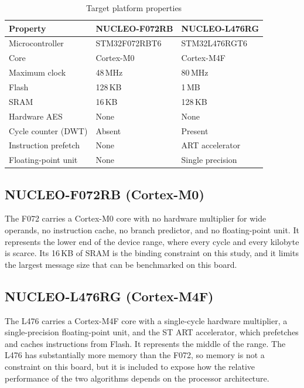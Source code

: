 \begin{table}[htbp]
  \centering
  \caption{Target platform properties}
  \label{tbl:platforms}
  \begin{tabular}{lll}
    \toprule
    Property              & NUCLEO-F072RB     & NUCLEO-L476RG    \\
    \midrule
    Microcontroller       & STM32F072RBT6     & STM32L476RGT6    \\
    Core                  & Cortex-M0         & Cortex-M4F       \\
    Maximum clock         & 48\,MHz           & 80\,MHz          \\
    Flash                 & 128\,KB           & 1\,MB            \\
    SRAM                  & 16\,KB            & 128\,KB          \\
    Hardware AES          & None              & None             \\
    Cycle counter (DWT)   & Absent            & Present          \\
    Instruction prefetch  & None              & ART accelerator  \\
    Floating-point unit   & None              & Single precision \\
    \bottomrule
  \end{tabular}
\end{table}

\subsection{NUCLEO-F072RB (Cortex-M0)}

The F072 carries a Cortex-M0 core with no hardware multiplier for wide
operands, no instruction cache, no branch predictor, and no floating-point
unit.
It represents the lower end of the device range, where every cycle and every
kilobyte is scarce.
Its 16\,KB of SRAM is the binding constraint on this study, and it limits the
largest message size that can be benchmarked on this board.

\subsection{NUCLEO-L476RG (Cortex-M4F)}

The L476 carries a Cortex-M4F core with a single-cycle hardware multiplier, a
single-precision floating-point unit, and the ST ART accelerator, which
prefetches and caches instructions from Flash.
It represents the middle of the range.
The L476 has substantially more memory than the F072, so memory is not a
constraint on this board, but it is included to expose how the relative
performance of the two algorithms depends on the processor architecture.

